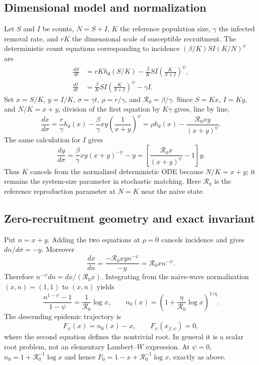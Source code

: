 \documentclass[11pt,a4paper]{article}
\newcommand{\Rzero}{\mathcal R_0}
\begin{document}
\subsection{Dimensional model and normalization}
Let $S$ and $I$ be counts, $N=S+I$, $K$ the reference population size,
$\gamma$ the infected removal rate, and $rK$ the dimensional scale of
susceptible recruitment.  The deterministic count equations corresponding to
incidence $(\beta/K)SI(K/N)^\psi$ are
\begin{align}
 \frac{dS}{dt}&=rK h_\theta(S/K)
 -\frac{\beta}{K}SI\left(\frac K{S+I}\right)^\psi,\nonumber\\
 \frac{dI}{dt}&=\frac{\beta}{K}SI\left(\frac K{S+I}\right)^\psi-\gamma I.
 \label{eq:dimensional-psi}
\end{align}
Set $x=S/K$, $y=I/K$, $\sigma=\gamma t$,
$\rho=r/\gamma$, and $\Rzero=\beta/\gamma$.  Since
$S=Kx$, $I=Ky$, and $N/K=x+y$, division of the first equation by $K\gamma$
gives, line by line,
\[
 \frac{dx}{d\sigma}=\frac r\gamma h_\theta(x)
 -\frac\beta\gamma xy\left(\frac1{x+y}\right)^\psi
 =\rho h_\theta(x)-\frac{\Rzero xy}{(x+y)^\psi}.
\]
The same calculation for $I$ gives
\[
 \frac{dy}{d\sigma}=\frac\beta\gamma xy(x+y)^{-\psi}-y
 =\left[\frac{\Rzero x}{(x+y)^\psi}-1\right]y.
\]
Thus $K$ cancels from the normalized deterministic ODE because $N/K=x+y$;
it remains the system-size parameter in stochastic matching.  Here $\Rzero$
is the reference reproduction parameter at $N=K$ near the naive state.

\subsection{Zero-recruitment geometry and exact invariant}
Put $n=x+y$.  Adding the two equations at $\rho=0$ cancels incidence and gives
$dn/d\sigma=-y$.  Moreover
\[
 \frac{dx}{dn}=\frac{-\Rzero xy n^{-\psi}}{-y}
 =\Rzero x n^{-\psi}.
\]
Therefore $n^{-\psi}dn=dx/(\Rzero x)$.  Integrating from the naive-wave
normalization $(x,n)=(1,1)$ to $(x,n)$ yields
\[
 \frac{n^{1-\psi}-1}{1-\psi}=\frac1{\Rzero}\log x,
 \qquad
 n_0(x)=\left(1+\frac{\eta}{\Rzero}\log x\right)^{1/\eta}.
\]
The descending epidemic trajectory is
\begin{equation}
 F_\psi(x)=n_0(x)-x,\qquad F_\psi(x_{f,\psi})=0,
 \label{eq:Fpsi}
\end{equation}
where the second equation defines the nontrivial root.  In general it is a
scalar root problem, not an elementary Lambert--$W$ expression.  At $\psi=0$,
$n_0=1+\Rzero^{-1}\log x$ and hence
$F_0=1-x+\Rzero^{-1}\log x$, exactly as above.
\end{document}
